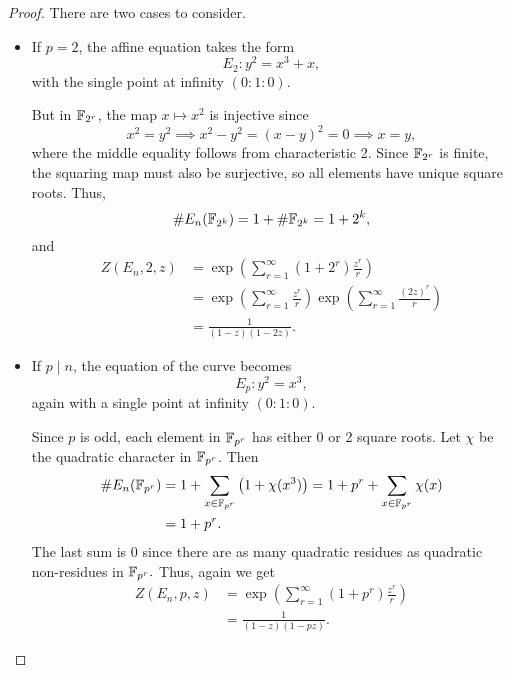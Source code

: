 \documentclass[12pt, a4paper]{report}
\begin{document}
\begin{proof}
  There are two cases to consider.
  \begin{itemize}
  \item If $p = 2$, the affine equation takes the form
    \[E_2: y^2 = x^3 + x,\] with the single point at infinity $(0:1:0).$

    But in $\mathbb{F}_{2^r}$, the map $x \mapsto x^2$ is injective since
    \[x^2 = y^2 \implies x^2-y^2 = (x-y)^2 = 0 \implies x = y,\] where the
    middle equality follows from characteristic 2. Since
    $\mathbb{F}_{2^r}$ is finite, the squaring map must also be surjective, so all
    elements have unique square roots. Thus,
    \[\# E_n(\mathbb{F}_{2^k}) = 1 + \# \mathbb{F}_{2^k} = 1 + 2^{k},\] and
    \begin{equation*}
      \begin{split}
        Z(E_n,2,z) &= \exp \left( \sum\limits_{r=1}^\infty (1 + 2^r)\frac{z^r}{r}
                     \right) \\
                   &= \exp \left( \sum\limits_{r=1}^\infty \frac{z^r}{r} \right) 
                     \exp \left( \sum\limits_{r=1}^\infty \frac{(2z)^r}{r} \right) \\
                   &= \frac{1}{(1-z)(1-2z)}.
      \end{split}
    \end{equation*}
  \item If $p \mid n$, the equation of the curve becomes
    \[E_p: y^2 = x^3,\]
    again with a single point at infinity $(0:1:0)$.

    Since $p$ is odd, each element in $\mathbb{F}_{p^r}$ has either 0 or 2 square
    roots. Let $\chi$ be the quadratic character in $\mathbb{F}_{p^r}$. Then
    \begin{equation*}
      \begin{split}
        \# E_n(\mathbb{F}_{p^r}) &= 1 + \sum\limits_{x \in \mathbb{F}_{p^r}}
        \left( 1 + \chi(x^3) \right) = 1 + p^r + \sum\limits_{x \in \mathbb{F}_{p^r}}
                            \chi(x)  \\
                          &= 1 + p^r.
      \end{split}
    \end{equation*}
    The last sum is 0 since there are as many quadratic residues as quadratic
    non-residues in $\mathbb{F}_{p^r}.$ 
    Thus, again we get
    \begin{equation*}
      \begin{split}
        Z(E_n, p, z) &= \exp \left(\sum\limits_{r=1}^\infty (1+p^r) \frac{z^r}{r}\right) \\
                     &= \frac{1}{(1-z)(1-pz)}.
      \end{split}
    \end{equation*} \qedhere
    
  \end{itemize}
  
  
\end{proof}
\end{document}
